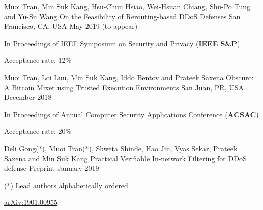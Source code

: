 


\begin{cventries}

  \cventry
    {\underline{Muoi Tran}, Min Suk Kang, Hsu-Chun Hsiao, Wei-Hsuan Chiang, Shu-Po Tung and Yu-Su Wang} %
    {On the Feasibility of Rerouting-based DDoS Defenses } %
    {San Francisco, CA, USA} %
    {May 2019 (to appear)} %
    {
      \begin{cvitems} %
        \item {\href{https://www.ieee-security.org/TC/SP2019/}{In Proceedings of IEEE Symposium on Security and Privacy (\textbf{IEEE S\&P})}}
        \item {Acceptance rate: 12\%}
      \end{cvitems}
    }

  \cventry
    {\underline{Muoi Tran}, Loi Luu, Min Suk Kang, Iddo Bentov and Prateek Saxena } %
    {Obscuro: A Bitcoin Mixer using Trusted Execution Environments} %
    {San Juan, PR, USA}
    {December 2018} %
    {
      \begin{cvitems} %
        \item {In \href{https://www.acsac.org/2018/}{Proceedings of Annual Computer Security Applications Conference (\textbf{ACSAC})}}
        \item {Acceptance rate: 20\%} %
      \end{cvitems}
    }

  \cventry
    {Deli Gong(*), \underline{Muoi Tran}(*), Shweta Shinde, Hao Jin, Vyas Sekar, Prateek Saxena and Min Suk Kang} %
    {Practical Verifiable In-network Filtering for DDoS defense} %
    {Preprint}
    {January 2019}
    {
      \begin{cvitems} %
        \item {(*) Lead authors alphabetically ordered}
        \item {\href{https://arxiv.org/abs/1901.00955}{arXiv:1901.00955}}
      \end{cvitems}
    }

\end{cventries}



